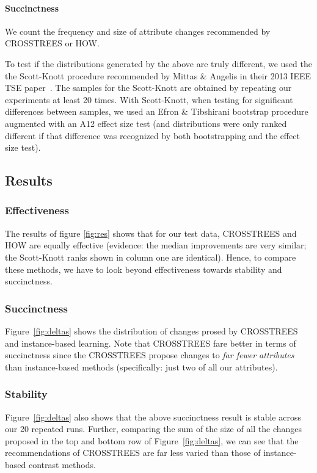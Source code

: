 \documentclass[conference]{IEEEtran}
\newcommand{\fig}[1]{Figure~\ref{fig:#1}}
\begin{document}
	
	

	\paragraph{Succinctness} We count the frequency and size of attribute changes recommended by CROSSTREES or HOW.

To test if the distributions generated by the above are truly different, we
used the the Scott-Knott procedure recommended by Mittas \& Angelis in their 2013
IEEE TSE paper~\cite{mittas13}. The samples for the Scott-Knott are  obtained by repeating our experiments at least 20 times. With Scott-Knott, when testing for significant differences between samples, we used an Efron \&
Tibshirani bootstrap procedure~\cite[p220-223]{efron93} augmented with an A12 effect size test (and distributions were only ranked  different if that difference was recognized by
both bootstrapping and the effect size test).

\subsection{Results}
	
\subsubsection{Effectiveness}
The results of figure \ref{fig:res} shows that for our test data, CROSSTREES and HOW are equally effective (evidence: the median improvements are very similar; the Scott-Knott ranks shown in column one are identical). Hence, to compare these methods, we have to look
beyond effectiveness towards stability and succinctness.

\subsubsection{Succinctness}

\fig{deltas} shows the distribution of changes prosed by CROSSTREES
and instance-based learning.  Note that CROSSTREES fare better in terms
of succinctness since the CROSSTREES propose changes to {\em far fewer attributes}
than instance-based methods (specifically: just two of all our attributes).

\subsubsection{Stability}
\fig{deltas} also shows that the above succinctness result is stable across
our 20 repeated runs. Further, comparing the sum of  the size of all the changes proposed in the top and bottom row of \fig{deltas}, we can see that the recommendations of CROSSTREES are far less varied than those of instance-based contrast methods.
 
\end{document}
